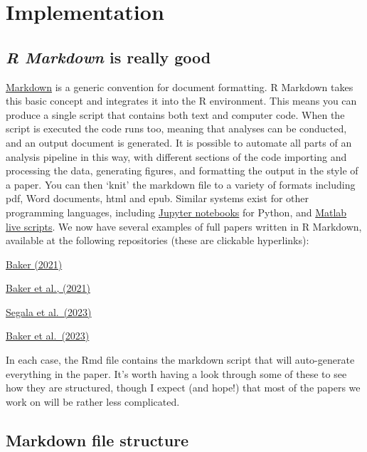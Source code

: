 \documentclass[
]{article}
\begin{document}
\hypertarget{implementation}{%
\section{Implementation}\label{implementation}}

\hypertarget{r-markdown-is-really-good}{%
\subsection{\texorpdfstring{\emph{R Markdown} is really good}{R Markdown is really good}}\label{r-markdown-is-really-good}}

\href{https://www.markdownguide.org/}{Markdown} is a generic convention for document formatting. R Markdown takes this basic concept and integrates it into the R environment. This means you can produce a single script that contains both text and computer code. When the script is executed the code runs too, meaning that analyses can be conducted, and an output document is generated. It is possible to automate all parts of an analysis pipeline in this way, with different sections of the code importing and processing the data, generating figures, and formatting the output in the style of a paper. You can then `knit' the markdown file to a variety of formats including pdf, Word documents, html and epub. Similar systems exist for other programming languages, including \href{https://jupyter.org/}{Jupyter notebooks} for Python, and \href{https://uk.mathworks.com/help/matlab/matlab_prog/what-is-a-live-script-or-function.html}{Matlab live scripts}. We now have several examples of full papers written in R Markdown, available at the following repositories (these are clickable hyperlinks):

\href{https://github.com/bakerdh/FourierStats}{Baker (2021)}

\href{https://osf.io/e62wu/}{Baker et al., (2021)}

\href{https://doi.org/10.17605/OSF.IO/TBEMA}{Segala et al.~(2023)}

\href{https://doi.org/10.17605/OSF.IO/AB3YV}{Baker et al.~(2023)}

In each case, the Rmd file contains the markdown script that will auto-generate everything in the paper. It's worth having a look through some of these to see how they are structured, though I expect (and hope!) that most of the papers we work on will be rather less complicated.

\hypertarget{markdown-file-structure}{%
\subsection{Markdown file structure}\label{markdown-file-structure}}
\end{document}
